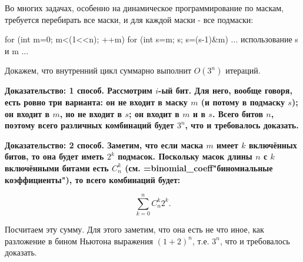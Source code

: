 Во многих задачах, особенно на динамическое программирование по маскам, требуется перебирать все маски, и для каждой маски - все подмаски:

\code
for (int m=0; m<(1<<n); ++m)
	for (int s=m; s; s=(s-1)&m)
		... использование s и m ...
\endcode

Докажем, что внутренний цикл суммарно выполнит $O (3^n)$ итераций.

\bf{Доказательство: 1 способ}. Рассмотрим $i$-ый бит. Для него, вообще говоря, есть ровно три варианта: он не входит в маску $m$ (и потому в подмаску $s$); он входит в $m$, но не входит в $s$; он входит в $m$ и в $s$. Всего битов $n$, поэтому всего различных комбинаций будет $3^n$, что и требовалось доказать.

\bf{Доказательство: 2 способ}. Заметим, что если маска $m$ имеет $k$ включённых битов, то она будет иметь $2^k$ подмасок. Поскольку масок длины $n$ с $k$ включёнными битами есть $C_n^k$ (см. \algohref=binomial_coeff{"биномиальные коэффициенты"}), то всего комбинаций будет:

$$ \sum_{k=0}^n C_n^k 2^k. $$

Посчитаем эту сумму. Для этого заметим, что она есть не что иное, как разложение в бином Ньютона выражения $(1+2)^n$, т.е. $3^n$, что и требовалось доказать.